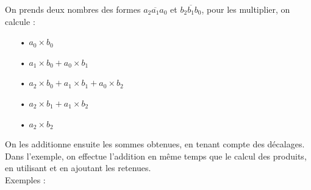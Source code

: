 \documentclass[a4paper, twoside]{article}
\begin{document}
		{ \parindent=0.5cm On prends deux nombres des formes $\overline{a_2 a_1 a_0}$ et $\overline{b_2 b_1 b_0}$, pour les multiplier, on calcule :}

		\begin{itemize}

			\item[•] $a_{0} \times b_{0}$
			\item[•] $a_1 \times b_{0} + a_{0} \times b_1$
			\item[•] $a_{2} \times b_{0} + a_1 \times b_1 + a_{0} \times b_{2}$
			\item[•] $a_{2} \times b_1 + a_1 \times b_{2}$
			\item[•] $a_{2} \times b_{2}$\\
			
		\end{itemize}

		On les additionne ensuite les sommes obtenues, en tenant compte des décalages. Dans l'exemple, on effectue l'addition en même temps que le calcul des produits, en utilisant et en ajoutant les retenues.\\


		{ \parindent=0.5cm Exemples : }
\end{document}
